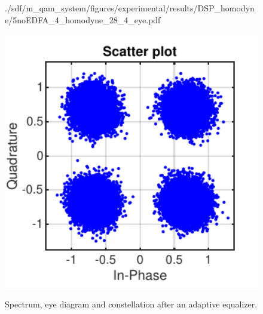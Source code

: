 \begin{figure}[H]
\begin{minipage}{0.30\textwidth}
			{./sdf/m_qam_system/figures/experimental/results/DSP_homodyne/5noEDFA_4_homodyne_28_4_eye.pdf}
			\label{fig:16GBdSpecMF}
		\end{minipage}
		\begin{minipage}{0.30\textwidth}
			\centering
			\includegraphics[width=1\textwidth]
			{./sdf/m_qam_system/figures/experimental/results/DSP_homodyne/5noEDFA_4_homodyne_28_4_const.pdf}\\
			\label{fig:16GBdSpecBefFec}
		\end{minipage}
		\caption{Spectrum, eye diagram and constellation after an adaptive equalizer.}
		\label{fig:4GBdFinalHmi}
	\end{figure}


